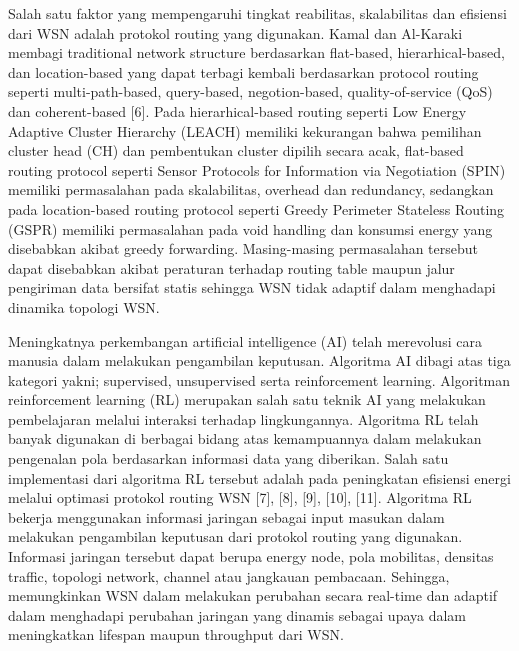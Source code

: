 \documentclass[conference]{IEEEtran}
\begin{document}
Salah satu faktor yang mempengaruhi tingkat reabilitas, skalabilitas dan efisiensi dari WSN adalah protokol routing yang digunakan. Kamal dan Al-Karaki membagi traditional network structure berdasarkan flat-based, hierarhical-based, dan location-based yang dapat terbagi kembali berdasarkan protocol routing seperti multi-path-based, query-based, negotion-based, quality-of-service (QoS) dan coherent-based [6]. Pada hierarhical-based routing seperti Low Energy Adaptive Cluster Hierarchy (LEACH) memiliki kekurangan bahwa pemilihan cluster head (CH) dan pembentukan cluster dipilih secara acak, flat-based routing protocol seperti Sensor Protocols for Information via Negotiation (SPIN) memiliki permasalahan pada skalabilitas, overhead dan redundancy, sedangkan pada location-based routing protocol seperti Greedy Perimeter Stateless Routing (GSPR) memiliki permasalahan pada void handling dan konsumsi energy yang disebabkan akibat greedy forwarding.   Masing-masing permasalahan tersebut dapat disebabkan akibat peraturan terhadap routing table maupun jalur pengiriman data bersifat statis sehingga WSN tidak adaptif dalam menghadapi dinamika topologi WSN.

Meningkatnya perkembangan artificial intelligence (AI) telah merevolusi cara manusia dalam melakukan pengambilan keputusan. Algoritma AI dibagi atas tiga kategori yakni; supervised, unsupervised serta reinforcement learning. Algoritman reinforcement learning (RL) merupakan salah satu teknik AI yang melakukan pembelajaran melalui interaksi terhadap lingkungannya. Algoritma RL telah banyak digunakan di berbagai bidang atas kemampuannya dalam melakukan pengenalan pola berdasarkan informasi data yang diberikan. Salah satu implementasi dari algoritma RL tersebut adalah pada peningkatan efisiensi energi melalui optimasi protokol routing WSN [7], [8], [9], [10], [11]. Algoritma RL bekerja menggunakan informasi jaringan sebagai input masukan dalam melakukan pengambilan keputusan dari protokol routing yang digunakan. Informasi jaringan tersebut dapat berupa energy node, pola mobilitas, densitas traffic, topologi network, channel atau jangkauan pembacaan. Sehingga, memungkinkan WSN dalam melakukan perubahan secara real-time dan adaptif dalam menghadapi perubahan jaringan yang dinamis sebagai upaya dalam meningkatkan lifespan maupun throughput dari WSN.
\end{document}
